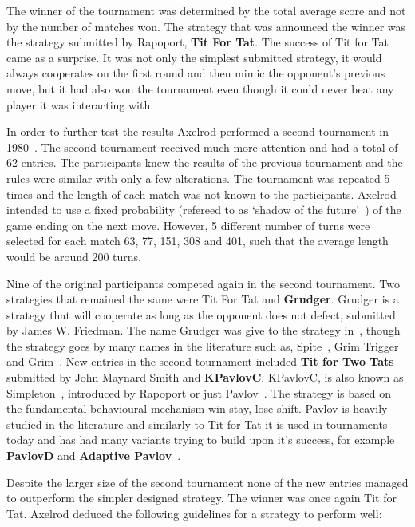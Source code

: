 The winner of the tournament was determined by the total average score and not
by the number of matches won. The strategy that was announced the winner was the
strategy submitted by Rapoport, \textbf{Tit For Tat}. The success of Tit for Tat
came as a surprise. It was not only the simplest submitted strategy, it would
always cooperates on the first round and then mimic the opponent's previous
move, but it had also won the tournament even though it could never beat
any player it was interacting with.

In order to further test the results Axelrod performed a second tournament
in 1980~\cite{Axelrod1980b}. The second tournament received much more attention
and had a total of 62 entries. The participants knew the results of the previous
tournament and the rules were similar with only a few alterations. The
tournament was repeated 5 times and the length of each match was not known to
the participants. Axelrod intended to use a fixed probability (refereed to as
`shadow of the future'~\cite{Axelrod1988}) of the game ending on the next move.
However, 5 different number of turns were selected for each match 63, 77, 151,
308 and 401, such that the average length would be around 200 turns.

Nine of the original participants competed again in the second tournament. Two
strategies that remained the same were Tit For Tat and \textbf{Grudger}. Grudger
is a strategy that will cooperate as long as the opponent does not defect,
submitted by James W. Friedman. The name Grudger was give to the strategy
in~\cite{Li20141}, though the strategy goes by many names in the literature such
as, Spite~\cite{Beaufils1997}, Grim Trigger~\cite{Banks1990} and
Grim~\cite{Van2015}. New entries in the second tournament included \textbf{Tit
for Two Tats} submitted by John Maynard Smith and \textbf{KPavlovC}. KPavlovC,
is also known as Simpleton~\cite{rapoport1965}, introduced by Rapoport or just
Pavlov~\cite{Nowak1993}. The strategy is based on the fundamental behavioural
mechanism win-stay, lose-shift. Pavlov is heavily studied in the literature and
similarly to Tit for Tat it is used in tournaments today and has
had many variants trying to build upon it's success, for example
\textbf{PavlovD} and \textbf{Adaptive Pavlov}~\cite{Li2007}.

Despite the larger size of the second tournament none of the new entries managed
to outperform the simpler designed strategy. The winner was once again Tit for
Tat. Axelrod deduced the following guidelines for a strategy to perform well:

